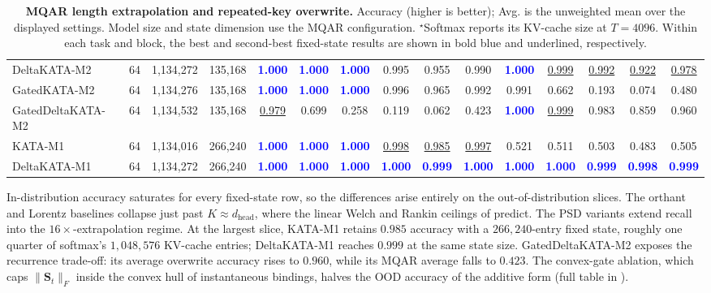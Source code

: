 \documentclass{article}
\newcommand{\1}{\bm{1}}
\newcommand{\norm}[1]{\lVert {#1} \rVert}
\def\mS{{\bm{S}}}
\newcommand{\seql}{T}
\theoremstyle{definition}
\begin{document}
\begin{table}[t]
\begin{tabular}{l|c|rr|cccccc|ccccc}
    DeltaKATA-M2
      & 64 & 1{,}134{,}272 & 135{,}168
      & \textcolor{blue}{\textbf{1.000}} & \textcolor{blue}{\textbf{1.000}} & \textcolor{blue}{\textbf{1.000}} & 0.995 & 0.955 & 0.990
      & \textcolor{blue}{\textbf{1.000}} & \underline{0.999} & \underline{0.992} & \underline{0.922} & \underline{0.978} \\
    GatedKATA-M2
      & 64 & 1{,}134{,}276 & 135{,}168
      & \textcolor{blue}{\textbf{1.000}} & \textcolor{blue}{\textbf{1.000}} & \textcolor{blue}{\textbf{1.000}} & 0.996 & 0.965 & 0.992
      & 0.991 & 0.662 & 0.193 & 0.074 & 0.480 \\
    GatedDeltaKATA-M2
      & 64 & 1{,}134{,}532 & 135{,}168
      & \underline{0.979} & 0.699 & 0.258 & 0.119 & 0.062 & 0.423
      & \textcolor{blue}{\textbf{1.000}} & \underline{0.999} & 0.983 & 0.859 & 0.960 \\
    KATA-M1
      & 64 & 1{,}134{,}016 & 266{,}240
      & \textcolor{blue}{\textbf{1.000}} & \textcolor{blue}{\textbf{1.000}} & \textcolor{blue}{\textbf{1.000}} & \underline{0.998} & \underline{0.985} & \underline{0.997}
      & 0.521 & 0.511 & 0.503 & 0.483 & 0.505 \\
    DeltaKATA-M1
      & 64 & 1{,}134{,}272 & 266{,}240
      & \textcolor{blue}{\textbf{1.000}} & \textcolor{blue}{\textbf{1.000}} & \textcolor{blue}{\textbf{1.000}} & \textcolor{blue}{\textbf{1.000}} & \textcolor{blue}{\textbf{0.999}} & \textcolor{blue}{\textbf{1.000}}
      & \textcolor{blue}{\textbf{1.000}} & \textcolor{blue}{\textbf{1.000}} & \textcolor{blue}{\textbf{0.999}} & \textcolor{blue}{\textbf{0.998}} & \textcolor{blue}{\textbf{0.999}} \\
    \bottomrule
  \end{tabular}
  \caption{\textbf{MQAR length extrapolation and repeated-key overwrite.}
  Accuracy (higher is better); Avg. is the unweighted mean over the displayed settings.
  Model size and state dimension use the MQAR configuration.
  $^\star$Softmax reports its KV-cache size at $\seql{=}4096$.
  Within each task and block, the best and second-best fixed-state results are shown in bold blue and underlined, respectively.}
  \label{tab:mqar-overwrite}
  \label{tab:overwrite}
  \label{tab:mqar}
\end{table}


In-distribution accuracy saturates for every fixed-state row, so the differences arise entirely on
the out-of-distribution slices. The orthant and Lorentz baselines collapse just past
$K\!\approx\!d_\text{head}$, where the linear Welch and Rankin ceilings of
 predict. The PSD variants extend recall into the
$16\times$-extrapolation regime. At the largest slice, KATA-M1 retains $0.985$ accuracy with a
$266{,}240$-entry fixed state, roughly one quarter of softmax's $1{,}048{,}576$ KV-cache entries;
DeltaKATA-M1 reaches $0.999$ at the same state size. GatedDeltaKATA-M2 exposes the recurrence
trade-off: its average overwrite accuracy rises to $0.960$, while its MQAR average falls to $0.423$.
The convex-gate ablation, which caps $\norm{\mS_t}_F$ inside the convex hull of instantaneous
bindings, halves the OOD accuracy of the additive form (full table in ).
\end{document}
